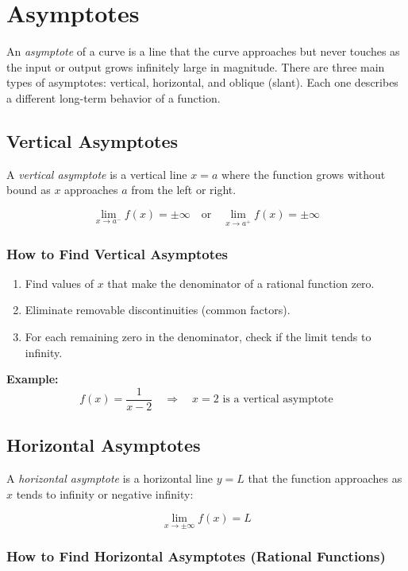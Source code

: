 \section{Asymptotes}

An \emph{asymptote} of a curve is a line that the curve approaches but never touches as the input or output grows infinitely large in magnitude. There are three main types of asymptotes: vertical, horizontal, and oblique (slant). Each one describes a different long-term behavior of a function.

\subsection{Vertical Asymptotes}

A \emph{vertical asymptote} is a vertical line \(x = a\) where the function grows without bound as \(x\) approaches \(a\) from the left or right.

\[
\lim_{x \to a^-} f(x) = \pm \infty \quad \text{or} \quad \lim_{x \to a^+} f(x) = \pm \infty
\]

\subsubsection{How to Find Vertical Asymptotes}

\begin{enumerate}
    \item Find values of \(x\) that make the denominator of a rational function zero.
    \item Eliminate removable discontinuities (common factors).
    \item For each remaining zero in the denominator, check if the limit tends to infinity.
\end{enumerate}

\textbf{Example:}
\[
f(x) = \frac{1}{x - 2} \quad \Rightarrow \quad x = 2 \text{ is a vertical asymptote}
\]

\subsection{Horizontal Asymptotes}

A \emph{horizontal asymptote} is a horizontal line \(y = L\) that the function approaches as \(x\) tends to infinity or negative infinity:

\[
\lim_{x \to \pm\infty} f(x) = L
\]

\subsubsection{How to Find Horizontal Asymptotes (Rational Functions)}

